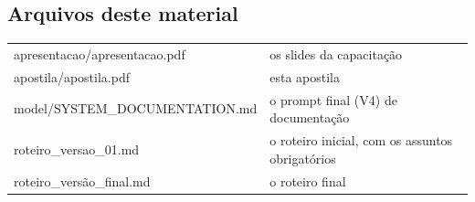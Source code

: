 \subsection*{Arquivos deste material}

\begin{center}
\renewcommand{\arraystretch}{1.3}
\small
\begin{tabularx}{\linewidth}{@{}>{\ttfamily\footnotesize}l X@{}}
\toprule
apresentacao/apresentacao.pdf & os slides da capacitação \\
apostila/apostila.pdf & esta apostila \\
model/SYSTEM\_DOCUMENTATION.md & o prompt final (V4) de documentação \\
roteiro\_versao\_01.md & o roteiro inicial, com os assuntos obrigatórios \\
roteiro\_versão\_final.md & o roteiro final \\
\bottomrule
\end{tabularx}
\end{center}
